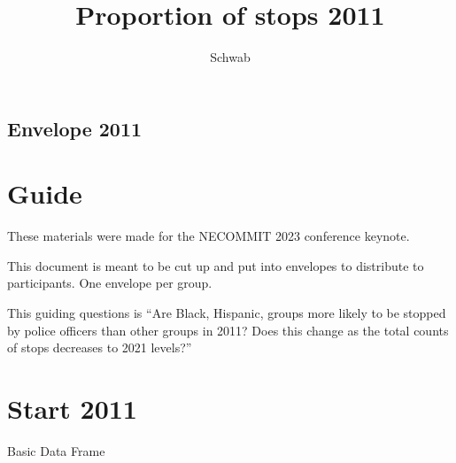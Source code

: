 \documentclass[
  letterpaper,
  DIV=11,
  numbers=noendperiod]{scrartcl}
\title{Proportion of stops 2011}
\author{Schwab}
\date{}
\begin{document}
\maketitle
\ifdefined\Shaded\renewenvironment{Shaded}{\begin{tcolorbox}[frame hidden, sharp corners, breakable, interior hidden, enhanced, borderline west={3pt}{0pt}{shadecolor}, boxrule=0pt]}{\end{tcolorbox}}\fi

\hypertarget{envelope-2011}{%
\subsection{Envelope 2011}\label{envelope-2011}}

\hypertarget{guide}{%
\section{Guide}\label{guide}}

These materials were made for the NECOMMIT 2023 conference keynote.

This document is meant to be cut up and put into envelopes to distribute
to participants. One envelope per group.

This guiding questions is ``Are Black, Hispanic, groups more likely to
be stopped by police officers than other groups in 2011? Does this
change as the total counts of stops decreases to 2021 levels?''

\hypertarget{start-2011}{%
\section{Start 2011}\label{start-2011}}

\newpage

Basic Data Frame
\end{document}
